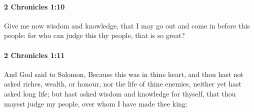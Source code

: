 		\paragraph{2 Chronicles 1:10} %
			\label{2CHRONICLES-1-10}

			Give me now wisdom and knowledge, that I may go out and come in before this people: for who can judge this thy people, that is so great?


		\paragraph{2 Chronicles 1:11} %
			\label{2CHRONICLES-1-11}

			And God said to Solomon, Because this was in thine heart, and thou hast not asked riches, wealth, or honour, nor the life of thine enemies, neither yet hast asked long life; but hast asked wisdom and knowledge for thyself, that thou mayest judge my people, over whom I have made thee king:

